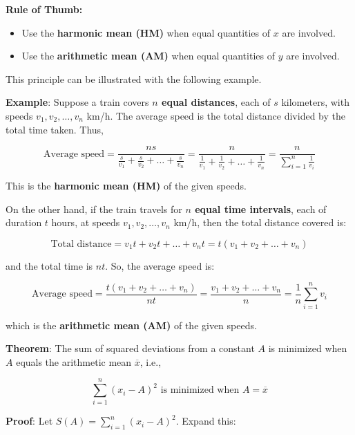 \documentclass[twoside]{book}
\begin{document}
\medskip

\begin{textbox}
\textbf{Rule of Thumb:}
\begin{itemize}
    \item Use the \textbf{harmonic mean (HM)} when equal quantities of $x$ are involved.
    \item Use the \textbf{arithmetic mean (AM)} when equal quantities of $y$ are involved.
\end{itemize}
\end{textbox}

\medskip

This principle can be illustrated with the following example.

\textbf{Example}: Suppose a train covers \textbf{\( n \) equal distances}, each of \( s \) kilometers, with speeds \( v_1, v_2, \dots, v_n \) km/h. The average speed is the total distance divided by the total time taken. Thus,

\[
\text{Average speed} = \frac{ns}{\frac{s}{v_1} + \frac{s}{v_2} + \dots + \frac{s}{v_n}}
= \frac{n}{\frac{1}{v_1} + \frac{1}{v_2} + \dots + \frac{1}{v_n}}
= \frac{n}{\sum_{i=1}^n \frac{1}{v_i}}
\]

This is the \textbf{harmonic mean (HM)} of the given speeds.

\medskip

On the other hand, if the train travels for \textbf{\( n \) equal time intervals}, each of duration \( t \) hours, at speeds \( v_1, v_2, \dots, v_n \) km/h, then the total distance covered is:

\[
\text{Total distance} = v_1t + v_2t + \dots + v_nt = t(v_1 + v_2 + \dots + v_n)
\]

and the total time is \( nt \). So, the average speed is:

\[
\text{Average speed} = \frac{t(v_1 + v_2 + \dots + v_n)}{nt} = \frac{v_1 + v_2 + \dots + v_n}{n}
= \frac{1}{n} \sum_{i=1}^n v_i
\]

which is the \textbf{arithmetic mean (AM)} of the given speeds.


\begin{textbox}
    \textbf{Theorem}: The sum of squared deviations from a constant \( A \) is minimized when \( A \) equals the arithmetic mean \( \overline{x} \), i.e.,

\[
\sum_{i=1}^n (x_i - A)^2 \text{ is minimized when } A = \overline{x}
\]
\end{textbox}

\textbf{Proof}: Let \( S(A) = \sum_{i=1}^n (x_i - A)^2 \). Expand this:
\end{document}
